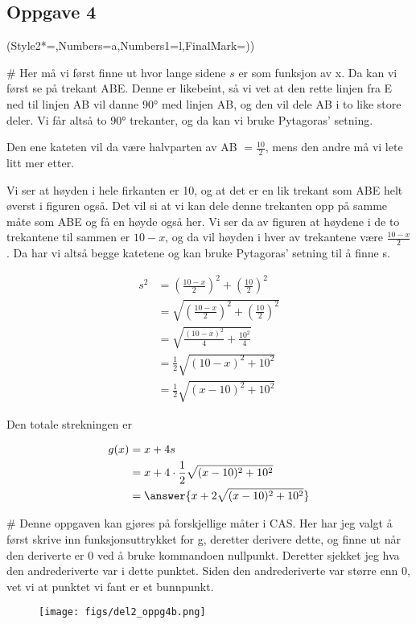 \subsection*{Oppgave 4}

\begin{easylist}[enumerate]
	\ListProperties(Style2*=,Numbers=a,Numbers1=l,FinalMark={)})
	
	# Her må vi først finne ut hvor lange sidene $s$ er som funksjon av x. Da kan vi først se på trekant ABE. Denne er likebeint, så vi vet at den rette linjen fra E ned til linjen AB vil danne $\ang{90}$ med linjen AB, og den vil dele AB i to like store deler. Vi får altså to $\ang{90}$ trekanter, og da kan vi bruke Pytagoras' setning. 
	
	Den ene kateten vil da være halvparten av AB $ = \frac{10}{2}$, mens den andre må vi lete litt mer etter.
	
	Vi ser at høyden i hele firkanten er 10, og at det er en lik trekant som ABE helt øverst i figuren også. Det vil si at vi kan dele denne trekanten opp på samme måte som ABE og få en høyde også her. Vi ser da av figuren at høydene i de to trekantene til sammen er $10-x$, og da vil høyden i hver av trekantene være $\frac{10-x}{2}$. Da har vi altså begge katetene og kan bruke Pytagoras' setning til å finne s.
	
	\begin{equation*}
	\begin{aligned}
		s^2 &= \left (\frac{10-x}{2} \right)^2	+ \left(\frac{10}{2} \right)^2 \\
		 & = \sqrt{\left (\frac{10-x}{2} \right)^2 + \left(\frac{10}{2} \right)^2} \\
		 & = \sqrt{\frac{(10-x)^2}{4} + \frac{10^2}{4}} \\
		 & = \frac{1}{2} \sqrt{(10-x)^2 + 10^2} \\
		 & = \frac{1}{2} \sqrt{(x-10)^2 + 10^2} 		
	\end{aligned}
	\end{equation*}
	
	Den totale strekningen er
	
	\begin{equation*}
		\begin{aligned}
			g(x) & = x + 4s \\
			& = x + 4 \cdot  \frac{1}{2} \sqrt{(x-10)^2 + 10^2} \\
			& = \answer{x + 2\sqrt{(x-10)^2 + 10^2}}
		\end{aligned}	
	\end{equation*}
	
	
	# Denne oppgaven kan gjøres på forskjellige måter i CAS. Her har jeg valgt å først skrive inn funksjonsuttrykket for g, deretter derivere dette, og finne ut når den deriverte er $0$ ved å bruke kommandoen nullpunkt. Deretter sjekket jeg hva den andrederiverte var i dette punktet. Siden den andrederiverte var større enn $0$, vet vi at punktet vi fant er et bunnpunkt.
	
	
	\begin{figure}[ht!]
		\centering
		\texttt{[image: figs/del2\_oppg4b.png]}
	\end{figure}
\end{easylist}

